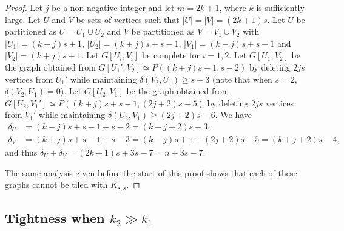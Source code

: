 \documentclass[oneside,12pt]{memoir}
\newtheorem{lemma}[theorem]{Lemma}
\begin{document}
\begin{proof}
Let $j$ be a non-negative integer and let $m=2k+1$, where $k$ is sufficiently large.  Let $U$ and $V$ be sets of vertices such that $|U|=|V|=(2k+1)s$.  Let $U$ be partitioned as $U=U_1\cup U_2$ and $V$ be partitioned as $V=V_1\cup V_2$ with $|U_1|=(k-j)s+1$, $|U_2|=(k+j)s+s-1$, $|V_1|=(k-j)s+s-1$ and $|V_2|=(k+j)s+1$.  Let $G[U_i, V_i]$ be complete for $i=1,2$.  Let $G[U_1, V_2]$ be the graph obtained from $G[U_1', V_2]\simeq P((k+j)s+1, s-2)$ by deleting $2js$ vertices from $U_1'$ while maintaining $\delta(V_2, U_1)\geq s-3$ (note that when $s=2$, $\delta(V_2, U_1)=0$).  Let $G[U_2, V_1]$ be the graph obtained from $G[U_2, V_1']\simeq P((k+j)s+s-1, (2j+2)s-5)$ by deleting $2js$ vertices from $V_1'$ while maintaining $\delta(U_2, V_1)\geq (2j+2)s-6$.
We have 
\begin{align*}
\delta_U&=(k-j)s+s-1+s-2=(k-j+2)s-3,\\
\delta_V&=(k+j)s+s-1+s-3=(k-j)s+1+(2j+2)s-5=(k+j+2)s-4,
\end{align*}
and thus $\delta_U+\delta_V= (2k+1)s+3s-7= n+3s-7.$

The same analysis given before the start of this proof shows that each of these graphs cannot be tiled with $K_{s,s}$.


\end{proof}





\subsection{Tightness when $k_2\gg k_1$}

% 
% 
% 
% 
% 
% 
% 
% 
% 
% 
% 
\end{document}

